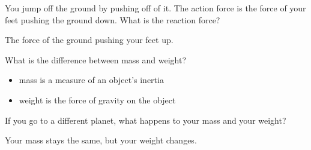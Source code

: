 \documentclass[10pt]{exam}
\begin{document}
\begin{questions}

  \question
    You jump off the ground by pushing off of it.  The action force is the force of your feet pushing the ground down.  What is the reaction force?

        \begin{solution}[\stretch{1}]
          The force of the ground pushing your feet up.
        \end{solution}


  \question
    What is the difference between mass and weight?

    \begin{solution}[\stretch{1}]
      \begin{itemize}
        \item mass is a measure of an object's inertia
        \item weight is the force of gravity on the object
      \end{itemize}
    \end{solution}


	\question 
    If you go to a different planet, what happens to your mass and your weight?

    \begin{solution}[\stretch{1}]
      Your mass stays the same, but your weight changes.
    \end{solution}


    



\end{questions}
\end{document}
